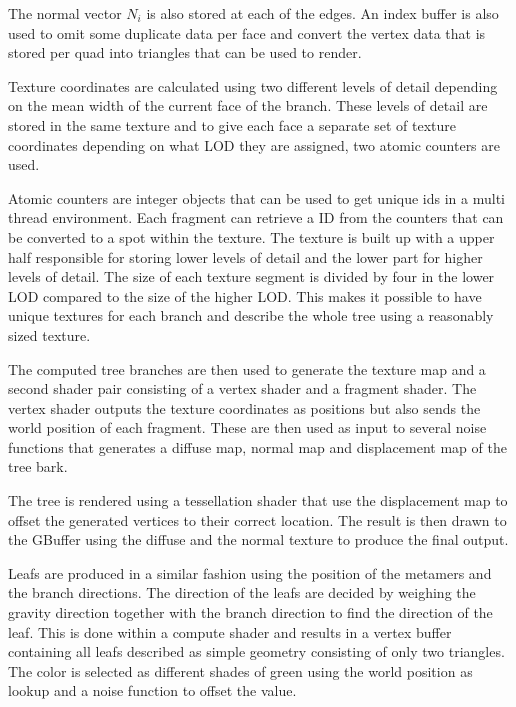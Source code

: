 \documentclass[11pt]{article} %
\begin{document}
The normal vector $ N_{i} $ is also stored at each of the edges.
An index buffer is also used to omit some duplicate data per face and convert the vertex data that is stored per quad into triangles that can be used to render.

Texture coordinates are calculated using two different levels of detail depending on the mean width of the current face of the branch.
These levels of detail are stored in the same texture and to give each face a separate set of texture coordinates depending on what LOD they are assigned, two atomic counters are used.

Atomic counters are integer objects that can be used to get unique ids in a multi thread environment.
Each fragment can retrieve a ID from the counters that can be converted to a spot within the texture.
The texture is built up with a upper half responsible for storing lower levels of detail and the lower part for higher levels of detail.
The size of each texture segment is divided by four in the lower LOD compared to the size of the higher LOD.
This makes it possible to have unique textures for each branch and describe the whole tree using a reasonably sized texture.

The computed tree branches are then used to generate the texture map and a second shader pair consisting of a vertex shader and a fragment shader.
The vertex shader outputs the texture coordinates as positions but also sends the world position of each fragment.
These are then used as input to several noise functions that generates a diffuse map, normal map and displacement map of the tree bark.

The tree is rendered using a tessellation shader that use the displacement map to offset the generated vertices to their correct location.
The result is then drawn to the GBuffer using the diffuse and the normal texture to produce the final output.

Leafs are produced in a similar fashion using the position of the metamers and the branch directions.
The direction of the leafs are decided by weighing the gravity direction together with the branch direction to find the direction of the leaf.
This is done within a compute shader and results in a vertex buffer containing all leafs described as simple geometry consisting of only two triangles.
The color is selected as different shades of green using the world position as lookup and a noise function to offset the value.
\end{document}
